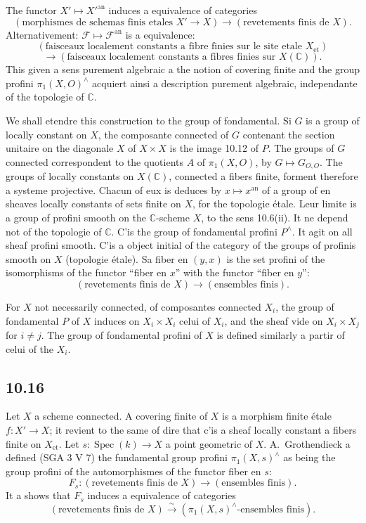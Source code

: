 \documentclass[12pt,a4paper]{article}
\theoremstyle{plain}
\theoremstyle{definition}
\theoremstyle{remark}
\DeclareMathOperator{\Spec}{Spec}
\newcommand{\C}{\mathbb{C}}
\begin{document}
The functor $X' \mapsto X'^{\mathrm{an}}$ induces a equivalence of categories
$$(\text{morphismes de schemas finis etales } X' \to X) \to (\text{revetements finis de } X).$$
Alternativement: $\mathcal{F} \mapsto \mathcal{F}^{\mathrm{an}}$ is a equivalence:
$$(\text{faisceaux localement constants a fibre finies sur le site etale } X_{\text{et}})$$
$$\to (\text{faisceaux localement constants a fibres finies sur } X(\C)).$$
This given a sens purement algebraic a the notion of covering finite and the group profini $\pi_1(X, O)^\wedge$ acquiert ainsi a description purement algebraic, independante of the topologie of $\C$.

We shall etendre this construction to the group of fondamental. Si $G$ is a group of locally constant on $X$, the composante connected of $G$ contenant the section unitaire on the diagonale $X$ of $X \times X$ is the image 10.12 of $P$. The groups of $G$ connected correspondent to the quotients $A$ of $\pi_1(X, O)$, by $G \mapsto G_{O,O}$. The groups of locally constants on $X(\C)$, connected a fibers finite, forment therefore a systeme projective. Chacun of eux is deduces by $x \mapsto x^{\mathrm{an}}$ of a group of en sheaves locally constants of sets finite on $X$, for the topologie étale. Leur limite is a group of profini smooth on the $\C$-scheme $X$, to the sens 10.6(ii). It ne depend not of the topologie of $\C$. C'is the group of fondamental profini $P^\wedge$. It agit on all sheaf profini smooth. C'is a object initial of the category of the groups of profinis smooth on $X$ (topologie étale). Sa fiber en $(y,x)$ is the set profini of the isomorphisms of the functor ``fiber en $x$'' with the functor ``fiber en $y$'':
$$(\text{revetements finis de } X) \longrightarrow (\text{ensembles finis}).$$

For $X$ not necessarily connected, of composantes connected $X_i$, the group of fondamental $P$ of $X$ induces on $X_i \times X_i$ celui of $X_i$, and the sheaf vide on $X_i \times X_j$ for $i \neq j$. The group of fondamental profini of $X$ is defined similarly a partir of celui of the $X_i$.

\subsection*{10.16}

Let $X$ a scheme connected. A covering finite of $X$ is a morphism finite étale $f: X' \to X$; it revient to the same of dire that c'is a sheaf locally constant a fibers finite on $X_{\text{et}}$. Let $s: \Spec(k) \to X$ a point geometric of $X$. A.~Grothendieck a defined (SGA 3 V 7) the fundamental group profini $\pi_1(X, s)^\wedge$ as being the group profini of the automorphismes of the functor fiber en $s$:
$$F_s: (\text{revetements finis de } X) \longrightarrow (\text{ensembles finis}).$$
It a shows that $F_s$ induces a equivalence of categories
$$(\text{revetements finis de } X) \xrightarrow{\sim} (\pi_1(X, s)^\wedge\text{-ensembles finis}).$$
\end{document}
